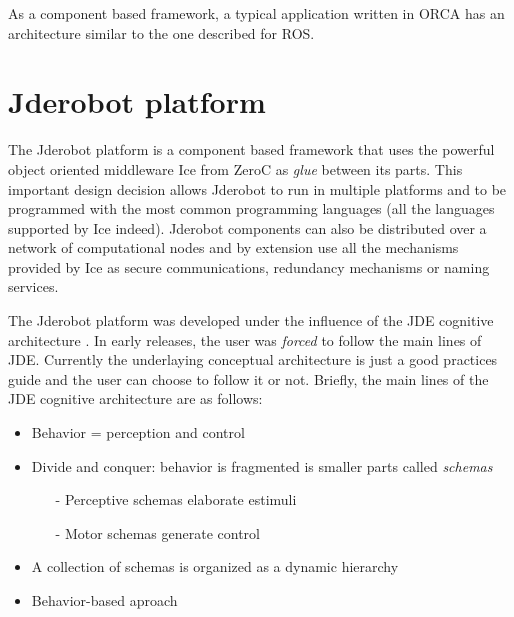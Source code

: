 \documentclass[twocolumn]{svjour3}          %
\begin{document}
As a component based framework, a typical application written in ORCA has an architecture similar to the one described for ROS.

\section{Jderobot platform}
\label{sec:jderobot}

The Jderobot platform is a component based framework that uses the powerful object oriented middleware Ice from ZeroC as \textit{glue} between its parts. This important design decision allows Jderobot to run in multiple platforms and to be programmed with the most common programming languages (all the languages supported by Ice indeed). Jderobot components can also be distributed over a network of computational nodes and by extension use all the mechanisms provided by Ice as secure communications, redundancy mechanisms or naming services. 


The Jderobot platform was developed under the influence of the JDE cognitive architecture \cite{canas02,canas05e}. In early releases, the user was \textit{forced} to follow the main lines of JDE. Currently the underlaying conceptual architecture is just a good practices guide and the user can choose to follow it or not. Briefly, the main lines of the JDE cognitive architecture are as follows:

\begin{itemize}
\item Behavior = {perception} and {control}
\item Divide and conquer: behavior is fragmented is smaller parts called \textit{schemas}
\begin{itemize}
\item[-] Perceptive schemas elaborate estimuli
\item[-] Motor schemas generate control
\end{itemize}
\item A collection of schemas is organized as a dynamic hierarchy
\item Behavior-based aproach
\end{itemize}
\end{document}
